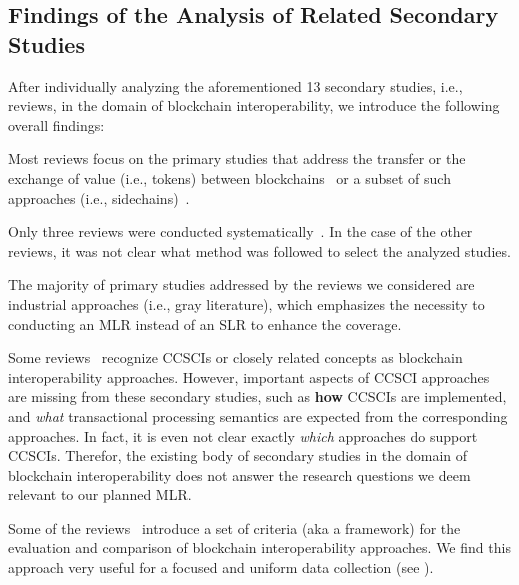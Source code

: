 \documentclass[review]{elsarticle}
\begin{document}
\subsection{Findings of the Analysis of Related Secondary Studies}
After individually analyzing the aforementioned 13 secondary studies, i.e., reviews, in the domain of blockchain interoperability, we introduce the following overall findings:
\begin{list}{-}{}
	\item Most reviews focus on the primary studies that address the transfer or the exchange of value (i.e., tokens) between blockchains~\cite{Fridaus2020InteroperabilityReview,Siris2019,Bishnoi2020Interoperability,Qasse2019} or a subset of such approaches (i.e., sidechains)~\cite{Johnson2019Sidechains,Singh2020Sidechains}.
	\item Only three reviews were conducted systematically~\cite{belchior2020survey,Kannengiesser2020,Singh2020Sidechains}.
	In the case of the other reviews, it was not clear what method was followed to select the analyzed studies.
	\item The majority of primary studies addressed by the reviews we considered are industrial approaches (i.e., gray literature), which emphasizes the necessity to conducting an MLR instead of an SLR to enhance the coverage.
	\item Some reviews~\cite{Qasse2019,Borkowski2019,Kannengiesser2020,belchior2020survey} recognize CCSCIs or closely related concepts as blockchain interoperability approaches.
	However, important aspects of CCSCI approaches are missing from these secondary studies, such as \textbf{how} CCSCIs are implemented, and \textit{what} transactional processing semantics are expected from the corresponding approaches.
	In fact, it is even not clear exactly \textit{which} approaches do support CCSCIs.
	Therefor, the existing body of secondary studies in the domain of blockchain interoperability does not answer the research questions we deem relevant to our planned MLR.
	\item Some of the reviews~\cite{belchior2020survey,Koens2019Assessing,Kannengiesser2020} introduce a set of criteria (aka a framework) for the evaluation and comparison of blockchain interoperability approaches.
	We find this approach very useful for a focused and uniform data collection (see ).
\end{list}
\end{document}
